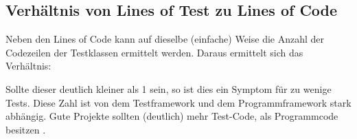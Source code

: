 \subsection{Verhältnis von Lines of Test zu Lines of Code}
Neben den Lines of Code kann auf dieselbe (einfache) Weise die Anzahl der Codezeilen der Testklassen ermittelt werden. Daraus ermittelt sich das Verhältnis:


Sollte dieser deutlich kleiner als 1 sein, so ist dies ein Symptom für zu wenige Tests. Diese Zahl ist von dem Testframework und dem Programmframework stark abhängig. Gute Projekte sollten (deutlich) mehr Test-Code, als Programmcode besitzen \citep[S. 238]{hunt_pragmatic_1999}.

